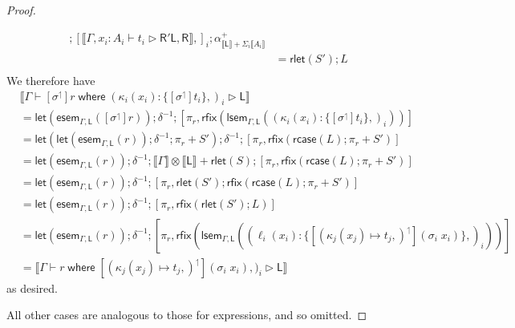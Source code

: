 \documentclass[acmsmall,screen,review]{acmart}
\newcommand{\ms}[1]{\ensuremath{\mathsf{#1}}}
\newcommand{\lto}{:}
\newcommand{\where}[2]{#1\;\ms{where}\;#2}
\newcommand{\wbranch}[3]{#1(#2) \lto \{#3\}}
\newcommand{\lupg}[1]{{#1}^\upharpoonleft}
\newcommand{\bhyp}[2]{#1 : #2}
\newcommand{\haslb}[3]{#1 \vdash #2 \rhd #3}
\newcommand{\dnt}[1]{\llbracket{#1}\rrbracket}
\newcommand{\entrymor}[3]{\ms{esem}_{#1, #3}(#2)}
\newcommand{\loopmor}[3]{\ms{lsem}_{#1, #3}(#2)}
\newcommand{\lmor}[1]{\ms{let}(#1)}
\newcommand{\rlmor}[1]{\ms{rlet}(#1)}
\newcommand{\rcase}[1]{\ms{rcase}(#1)}
\newcommand{\rfix}[1]{\ms{rfix}(#1)}
\begin{document}
\begin{proof}
\begin{itemize}[leftmargin=*]
\begin{equation}
\begin{aligned}
          ; [\dnt{\haslb{\Gamma, \bhyp{x_i}{A_i}}{t_i}{\ms{R}'}{\ms{L}, \ms{R}}},]_i
          ; \alpha^+_{\dnt{\ms{L}} + \Sigma_i \dnt{A_i}} \\
        & = \rlmor{S'} ; L \\
      \end{aligned}
    \end{equation}
    We therefore have
    \begin{equation}
      \begin{aligned}
        & \dnt{\haslb{\Gamma}
          {\where{[\lupg{\sigma}]r}{(\wbranch{\kappa_i}{x_i}{[\lupg{\sigma}]t_i},)_i}}
          {\ms{L}}} \\
        & = \lmor{\entrymor{\Gamma}{[\lupg{\sigma}]r}{\ms{L}}} ; \delta^{-1} ; [\pi_r,
          \rfix{\loopmor{\Gamma}{(\wbranch{\kappa_i}{x_i}{[\lupg{\sigma}]t_i},)_i}{\ms{L}}}] \\
        & = \lmor{\lmor{\entrymor{\Gamma}{r}{\ms{L}}} ; \delta^{-1} ; \pi_r + S'} ; \delta^{-1}
          ; [
              \pi_r,
              \rfix{\rcase{L} ; \pi_r + S'}
          ] \\
        & = \lmor{\entrymor{\Gamma}{r}{\ms{L}}} ; \delta^{-1} 
          ; \dnt{\Gamma} \otimes \dnt{\ms{L}} + \rlmor{S}
          ; [
            \pi_r,
            \rfix{\rcase{L} ; \pi_r + S'}
          ] \\
        & = \lmor{\entrymor{\Gamma}{r}{\ms{L}}} ; \delta^{-1} 
        ; [
          \pi_r,
          \rlmor{S'}
          ; \rfix{\rcase{L} ; \pi_r + S'}
        ] \\
        & = \lmor{\entrymor{\Gamma}{r}{\ms{L}}} ; \delta^{-1} 
        ; [
          \pi_r,
          \rfix{\rlmor{S'} ; L}
        ] \\
        & = \lmor{\entrymor{\Gamma}{r}{\ms{L}}} ; \delta^{-1} 
        ; [
          \pi_r,
          \rfix{
            \loopmor{\Gamma}{(\wbranch{\ell_i}{x_i}
                    {[\lupg{(\kappa_j(x_j) \mapsto t_j,)}](\sigma_i\;x_i)},)_i}{\ms{L}}}
        ] \\
        & = \dnt{\haslb{\Gamma}
          {\where{r}{[\lupg{(\kappa_j(x_j) \mapsto t_j,)}](\sigma_i\;x_i)},)_i}{\ms{L}}}
      \end{aligned}
    \end{equation}
    as desired.
  \end{itemize}
  All other cases are analogous to those for expressions, and so omitted.
\end{proof}
\end{document}
